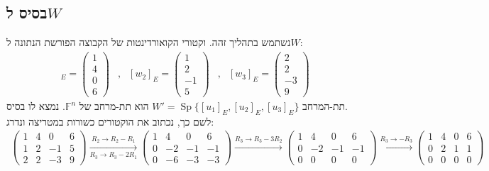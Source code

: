 \documentclass{article}
\DeclareMathOperator\Sp{Sp}
\begin{document}
\subsection*{בסיס ל$W$}

נשתמש בתהליך זהה. וקטורי הקואורדינטות של הקבוצה הפורשת הנתונה ל$W$:
\begin{align*}
    [w_1]_E=\begin{pmatrix}
        1 \\
        4 \\
        0 \\
        6
    \end{pmatrix} & , &
    [w_2]_E=\begin{pmatrix}
        1  \\
        2  \\
        -1 \\
        5
    \end{pmatrix} & , &
    [w_3]_E=\begin{pmatrix}
        2  \\
        2  \\
        -3 \\
        9
    \end{pmatrix}
\end{align*}
תת-המרחב $W'=\Sp\{ [u_1]_E, [u_2]_E, [u_3]_E \}$ הוא תת-מרחב של $\mathbb{F}^n$. נמצא לו בסיס. \\
לשם כך, נכתוב את הוקטורים כשורות במטריצה ונדרג:
\begin{align*}
    \begin{pmatrix}
        1 & 4 & 0  & 6 \\
        1 & 2 & -1 & 5 \\
        2 & 2 & -3 & 9
    \end{pmatrix}
    \xrightarrow[R_3\rightarrow R_3-2R_1]{R_2\rightarrow R_2-R_1}
    \begin{pmatrix}
        1 & 4  & 0  & 6  \\
        0 & -2 & -1 & -1 \\
        0 & -6 & -3 & -3
    \end{pmatrix}
    \xrightarrow[]{R_3\rightarrow R_3-3R_2}
    \begin{pmatrix}
        1 & 4  & 0  & 6  \\
        0 & -2 & -1 & -1 \\
        0 & 0  & 0  & 0
    \end{pmatrix}
    \xrightarrow[]{R_3\rightarrow -R_3}
    \begin{pmatrix}
        1 & 4 & 0 & 6 \\
        0 & 2 & 1 & 1 \\
        0 & 0 & 0 & 0
    \end{pmatrix}
\end{align*}
\end{document}
